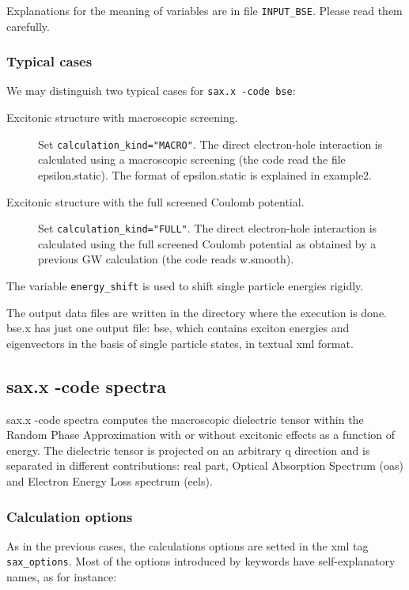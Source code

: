 \documentclass[11pt]{article}
\begin{document}
Explanations for the meaning of variables are in file \texttt{INPUT\_BSE}. Please read them carefully.

\subsubsection{Typical cases}

We may distinguish two typical cases for \texttt{sax.x -code bse}:

\begin{description}

  \item [Excitonic structure with macroscopic screening.]

    Set \texttt{calculation\_kind="MACRO"}. The direct electron-hole interaction is calculated using a macroscopic screening (the code read the file epsilon.static). The format of epsilon.static is explained in example2.
  \item [Excitonic structure with the full screened Coulomb potential.]

    Set \texttt{calculation\_kind="FULL"}. The direct electron-hole interaction is calculated using the full screened Coulomb potential as obtained by a previous GW calculation (the code reads w.smooth).
\end{description}

The variable \texttt{energy\_shift} is used to shift single particle energies rigidly.

The output data files are written in the directory where the execution is done. bse.x has just one output file: bse, which contains exciton energies and eigenvectors in the basis of single particle states, in textual xml format.

\subsection{sax.x -code spectra}
sax.x -code spectra computes the macroscopic dielectric tensor within the Random Phase Approximation with or without excitonic effects as a function of energy. The dielectric tensor is projected on an arbitrary q direction and is separated in different contributions: real part, Optical Absorption Spectrum (oas) and Electron Energy Loss spectrum (eels). 
\subsubsection{Calculation options}
As in the previous cases, the calculations options are setted in the xml tag \texttt{sax\_options}.
Most of the options introduced by keywords have self-explanatory names, as for instance:
\end{document}
